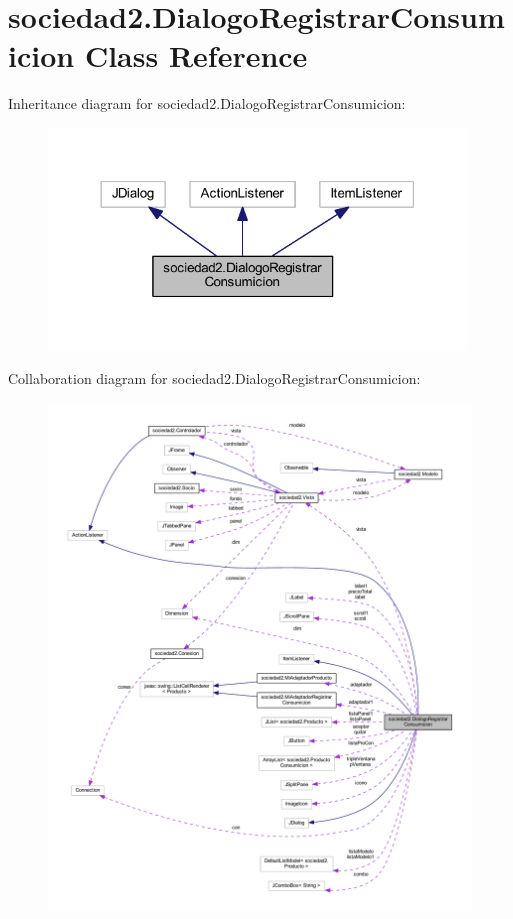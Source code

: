 \hypertarget{classsociedad2_1_1_dialogo_registrar_consumicion}{}\section{sociedad2.\+Dialogo\+Registrar\+Consumicion Class Reference}
\label{classsociedad2_1_1_dialogo_registrar_consumicion}


Inheritance diagram for sociedad2.\+Dialogo\+Registrar\+Consumicion\+:
\nopagebreak
\begin{figure}[H]
\begin{center}
\leavevmode
\includegraphics[width=314pt]{classsociedad2_1_1_dialogo_registrar_consumicion__inherit__graph}
\end{center}
\end{figure}


Collaboration diagram for sociedad2.\+Dialogo\+Registrar\+Consumicion\+:
\nopagebreak
\begin{figure}[H]
\begin{center}
\leavevmode
\includegraphics[width=350pt]{classsociedad2_1_1_dialogo_registrar_consumicion__coll__graph}
\end{center}
\end{figure}
